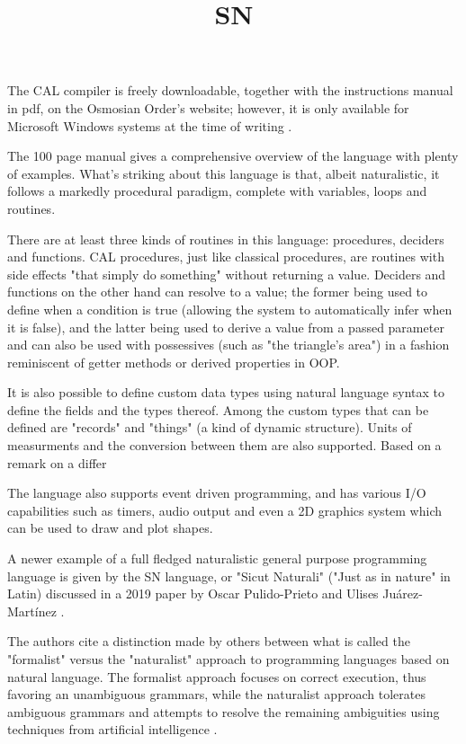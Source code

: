 The CAL compiler is freely downloadable, together with the instructions manual in pdf, on the Osmosian Order's website; however, it is only available for Microsoft Windows systems at the time of writing \cite{osmosianblog}.

The 100 page manual gives a comprehensive overview of the language with plenty of examples. What's striking about this language is that, albeit naturalistic, it follows a markedly procedural paradigm, complete with variables, loops and routines.

There are at least three kinds of routines in this language: procedures, deciders and functions. CAL procedures, just like classical procedures, are routines with side effects "that simply do something" without returning a value. Deciders and functions on the other hand can resolve to a value; the former being used to define when a condition is true (allowing the system to automatically infer when it is false), and the latter being used to derive a value from a passed parameter and can also be used with possessives (such as "the triangle's area") in a fashion reminiscent of getter methods or derived properties in OOP.

It is also possible to define custom data types using natural language syntax to define the fields and the types thereof. Among the custom types that can be defined are "records" and "things" (a kind of dynamic structure). Units of measurments and the conversion between them are also supported. Based on a remark on a differ


The language also supports event driven programming, and has various I/O capabilities such as timers, audio output and even a 2D graphics system which can be used to draw and plot shapes.

\title{SN}

A newer example of a full fledged naturalistic general purpose programming language is given by the SN language, or "Sicut Naturali" \cite{hernandez2021evolution} ("Just as in nature" in Latin) discussed in a 2019 paper by Oscar Pulido-Prieto and Ulises Juárez-Martínez \cite{pulido2019model}.

The authors cite a distinction made by others between what is called the "formalist" versus the "naturalist" approach to programming languages based on natural language. The formalist approach focuses on correct execution, thus favoring an unambiguous grammars, while the naturalist approach tolerates ambiguous grammars and attempts to resolve the remaining ambiguities using techniques from artificial intelligence \cite{pulido2019model}.

